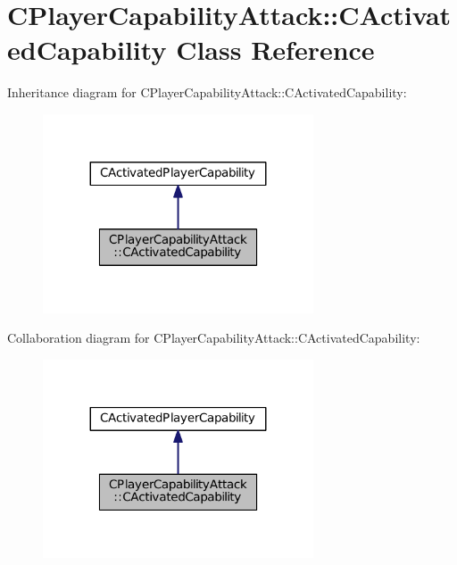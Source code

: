 \hypertarget{classCPlayerCapabilityAttack_1_1CActivatedCapability}{}\section{C\+Player\+Capability\+Attack\+:\+:C\+Activated\+Capability Class Reference}
\label{classCPlayerCapabilityAttack_1_1CActivatedCapability}


Inheritance diagram for C\+Player\+Capability\+Attack\+:\+:C\+Activated\+Capability\+:\nopagebreak
\begin{figure}[H]
\begin{center}
\leavevmode
\includegraphics[width=227pt]{classCPlayerCapabilityAttack_1_1CActivatedCapability__inherit__graph}
\end{center}
\end{figure}


Collaboration diagram for C\+Player\+Capability\+Attack\+:\+:C\+Activated\+Capability\+:\nopagebreak
\begin{figure}[H]
\begin{center}
\leavevmode
\includegraphics[width=227pt]{classCPlayerCapabilityAttack_1_1CActivatedCapability__coll__graph}
\end{center}
\end{figure}
